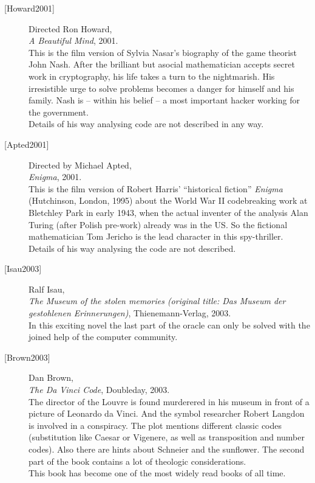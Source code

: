 \begin{description}
\item[\textrm{[Howard2001]}] 
    Directed Ron Howard, \\
    {\em A Beautiful Mind}, 2001. \\
    This is the film version of Sylvia Nasar's biography of the game theorist
    John Nash. 
    After the brilliant but asocial mathematician accepts secret work in 
    cryptography, his life takes a turn to the nightmarish.
    His irresistible urge to solve problems becomes a danger for himself and
    his family. Nash is -- within his belief -- a most important hacker
    working for the government.\\
    Details of his way analysing code are not described in any way.\\


\item[\textrm{[Apted2001]}] 
    Directed by Michael Apted, \\
    {\em Enigma}, 2001. \\
    This is the film version of Robert Harris' ``historical fiction'' 
    {\em Enigma} (Hutchinson, London, 1995) about the World War II 
    codebreaking work at Bletchley Park in early 1943, when the actual
    inventer of the analysis Alan Turing (after Polish pre-work) already 
    was in the US.
    So the fictional mathematician Tom Jericho is the lead character
    in this spy-thriller.\\
    Details of his way analysing the code are not described.\\


\item[\textrm{[Isau2003]}] 
    Ralf Isau, \\
    {\em The Museum of the stolen memories (original title: Das Museum
    der gestohlenen Erinnerungen)}, Thienemann-Verlag, 2003. \\
    In this exciting novel the last part of the oracle can only be
    solved with the joined help of the computer community.\\


\item[\textrm{[Brown2003]}] 
    Dan Brown, \\
    {\em The Da Vinci Code}, Doubleday, 2003. \\
    The director of the Louvre is found murderered in his museum in
    front of a picture of Leonardo da Vinci. And the symbol researcher
    Robert Langdon is involved in a conspiracy.
    The plot mentions different classic codes (substitution like
    Caesar or Vigenere, as well as transposition and number codes).
    Also there are hints about Schneier and the sunflower.
    The second part of the book contains a lot of theologic considerations.\\
    This book has become one of the most widely read books of all time.\\



\end{description}
